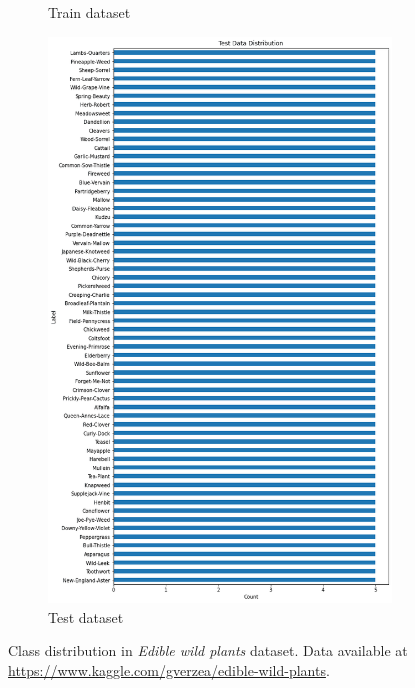 \begin{figure}[ht]
\begin{subfigure}{.48\textwidth}
    \caption{Train dataset}
\end{subfigure}
 \begin{subfigure}{.48\textwidth}
    \centering
    \includegraphics[width=\textwidth]{appendixes/images/edible-test.png}
    \caption{Test dataset}
\end{subfigure}

 \caption{Class distribution in \textit{Edible wild plants}\cite{edible-wild-plants} dataset. Data available at \url{https://www.kaggle.com/gverzea/edible-wild-plants}.}
\end{figure}

\FloatBarrier

